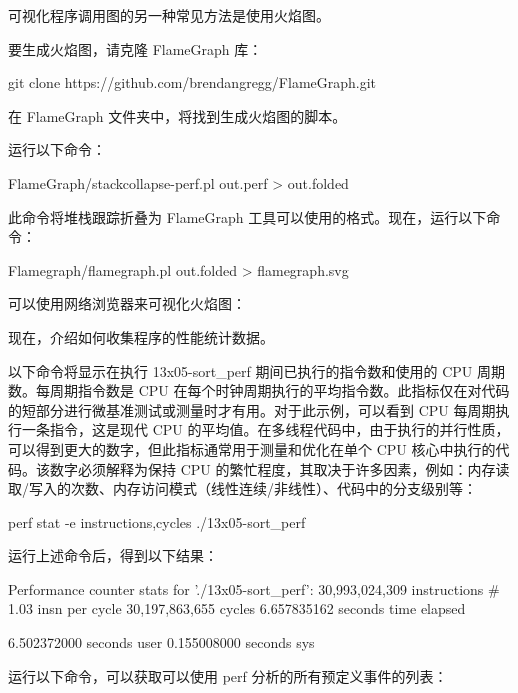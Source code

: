 可视化程序调用图的另一种常见方法是使用火焰图。

要生成火焰图，请克隆 FlameGraph 库：

\begin{shell}
git clone https://github.com/brendangregg/FlameGraph.git
\end{shell}

在 FlameGraph 文件夹中，将找到生成火焰图的脚本。

运行以下命令：

\begin{shell}
FlameGraph/stackcollapse-perf.pl out.perf > out.folded
\end{shell}

此命令将堆栈跟踪折叠为 FlameGraph 工具可以使用的格式。现在，运行以下命令：

\begin{shell}
Flamegraph/flamegraph.pl out.folded > flamegraph.svg
\end{shell}

可以使用网络浏览器来可视化火焰图：


现在，介绍如何收集程序的性能统计数据。

以下命令将显示在执行 13x05-sort\_perf 期间已执行的指令数和使用的 CPU 周期数。每周期指令数是 CPU 在每个时钟周期执行的平均指令数。此指标仅在对代码的短部分进行微基准测试或测量时才有用。对于此示例，可以看到 CPU 每周期执行一条指令，这是现代 CPU 的平均值。在多线程代码中，由于执行的并行性质，可以得到更大的数字，但此指标通常用于测量和优化在单个 CPU 核心中执行的代码。该数字必须解释为保持 CPU 的繁忙程度，其取决于许多因素，例如：内存读取/写入的次数、内存访问模式（线性连续/非线性）、代码中的分支级别等：

\begin{shell}
perf stat -e instructions,cycles ./13x05-sort_perf
\end{shell}

运行上述命令后，得到以下结果：

\begin{shell}
Performance counter stats for './13x05-sort_perf':
    30,993,024,309        instructions      #       1.03 insn per cycle
    30,197,863,655        cycles
    6.657835162 seconds time elapsed

    6.502372000 seconds user
    0.155008000 seconds sys
\end{shell}

运行以下命令，可以获取可以使用 perf 分析的所有预定义事件的列表：

